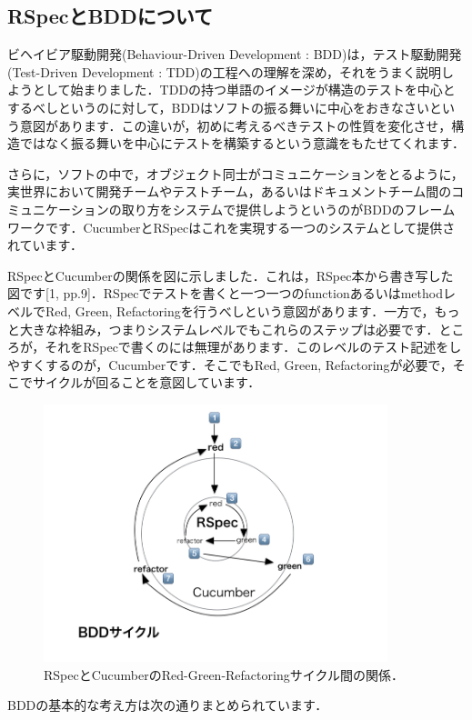 
\subsection{RSpecとBDDについて}
ビヘイビア駆動開発(Behaviour-Driven Development : BDD)は，テスト駆動開発(Test-Driven Development : TDD)の工程への理解を深め，それをうまく説明しようとして始まりました．TDDの持つ単語のイメージが構造のテストを中心とするべしというのに対して，BDDはソフトの振る舞いに中心をおきなさいという意図があります．この違いが，初めに考えるべきテストの性質を変化させ，構造ではなく振る舞いを中心にテストを構築するという意識をもたせてくれます．

さらに，ソフトの中で，オブジェクト同士がコミュニケーションをとるように，実世界において開発チームやテストチーム，あるいはドキュメントチーム間のコミュニケーションの取り方をシステムで提供しようというのがBDDのフレームワークです．CucumberとRSpecはこれを実現する一つのシステムとして提供されています．

RSpecとCucumberの関係を図に示しました．これは，RSpec本から書き写した図です[1, pp.9]．RSpecでテストを書くと一つ一つのfunctionあるいはmethodレベルでRed, Green, Refactoringを行うべしという意図があります．一方で，もっと大きな枠組み，つまりシステムレベルでもこれらのステップは必要です．ところが，それをRSpecで書くのには無理があります．このレベルのテスト記述をしやすくするのが，Cucumberです．そこでもRed, Green, Refactoringが必要で，そこでサイクルが回ることを意図しています．

\begin{figure}[htbp]\begin{center}
\includegraphics[width=10cm,bb= 0 0 737 453]{../figs/./my_help_nasu.001.jpg}
\caption{RSpecとCucumberのRed-Green-Refactoringサイクル間の関係．}
\label{default}\end{center}\end{figure}
BDDの基本的な考え方は次の通りまとめられています．

